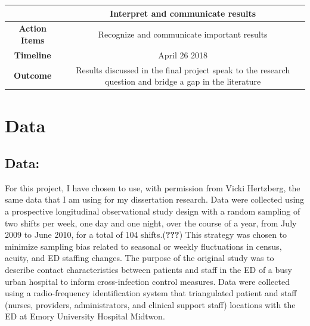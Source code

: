 \documentclass[]{elsarticle} %
\begin{document}
\begin{longtable}[]{@{}cc@{}}
\toprule
\begin{minipage}[b]{0.25\columnwidth}\centering\strut
~\strut
\end{minipage} & \begin{minipage}[b]{0.42\columnwidth}\centering\strut
Interpret and communicate results\strut
\end{minipage}\tabularnewline
\midrule
\endhead
\begin{minipage}[t]{0.25\columnwidth}\centering\strut
\textbf{Action Items}\strut
\end{minipage} & \begin{minipage}[t]{0.42\columnwidth}\centering\strut
Recognize and communicate important results\strut
\end{minipage}\tabularnewline
\begin{minipage}[t]{0.25\columnwidth}\centering\strut
\textbf{Timeline}\strut
\end{minipage} & \begin{minipage}[t]{0.42\columnwidth}\centering\strut
April 26 2018\strut
\end{minipage}\tabularnewline
\begin{minipage}[t]{0.25\columnwidth}\centering\strut
\textbf{Outcome}\strut
\end{minipage} & \begin{minipage}[t]{0.42\columnwidth}\centering\strut
Results discussed in the final project speak to the research question
and bridge a gap in the literature\strut
\end{minipage}\tabularnewline
\bottomrule
\end{longtable}

\section{Data}\label{data}

\subsection{Data:}\label{data-1}

For this project, I have chosen to use, with permission from Vicki
Hertzberg, the same data that I am using for my dissertation research.
Data were collected using a prospective longitudinal observational study
design with a random sampling of two shifts per week, one day and one
night, over the course of a year, from July 2009 to June 2010, for a
total of 104 shifts.({\textbf{???}}) This strategy was chosen to
minimize sampling bias related to seasonal or weekly fluctuations in
census, acuity, and ED staffing changes. The purpose of the original
study was to describe contact characteristics between patients and staff
in the ED of a busy urban hospital to inform cross-infection control
measures. Data were collected using a radio-frequency identification
system that triangulated patient and staff (nurses, providers,
administrators, and clinical support staff) locations with the ED at
Emory University Hospital Midtwon.
\end{document}
